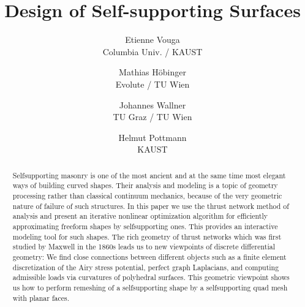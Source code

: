 \documentclass[review]{acmsiggraph}
\title{Design of Self-supporting Surfaces}
\author{
	Etienne Vouga
	\\ Columbia Univ. / KAUST
\and
	Mathias H\"obinger
	\\ Evolute / TU Wien
\and
	Johannes Wallner
	\\ TU Graz / TU Wien
\and 
	Helmut Pottmann
	\\ KAUST
}
\begin{document}



\maketitle


\begin{abstract} Self\dash supporting masonry is one of the most ancient 
and at the same time most elegant ways of building curved shapes. Their 
analysis and modeling is a topic of geometry processing rather than 
classical continuum mechanics, because of the very geometric nature of 
failure of such structures. In this paper we use the thrust network method 
of analysis and present an iterative nonlinear optimization algorithm for 
efficiently approximating freeform shapes by self\dash supporting ones. 
This provides an interactive modeling tool for such shapes. The rich 
geometry of thrust networks which was first studied by Maxwell in the 
1860s leads us to new viewpoints of discrete differential geometry: We 
find close connections between different objects such as a finite\dash 
element discretization of the Airy stress potential, perfect graph 
Laplacians, and computing admissible loads via curvatures of polyhedral 
surfaces. This geometric viewpoint shows us how to perform 
remeshing of a self\dash supporting shape by a self\dash supporting
quad mesh with planar faces.

\end{abstract}
\end{document}
